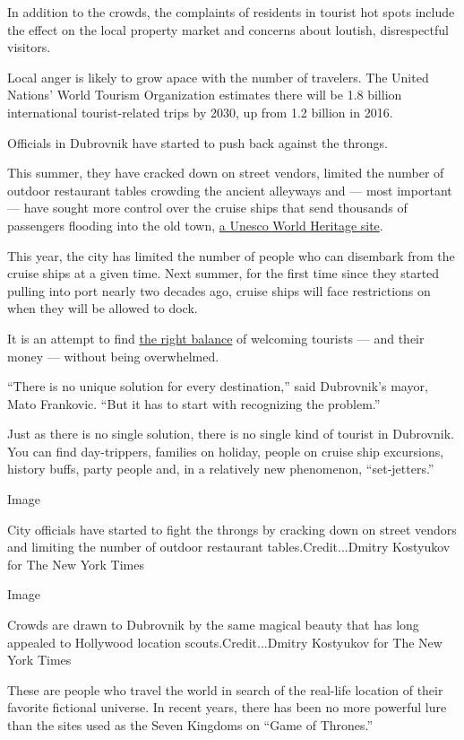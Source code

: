 In addition to the crowds, the complaints of residents in tourist hot
spots include the effect on the local property market and concerns about
loutish, disrespectful visitors.

Local anger is likely to grow apace with the number of travelers. The
United Nations' World Tourism Organization estimates there will be 1.8
billion international tourist-related trips by 2030, up from 1.2 billion
in 2016.

Officials in Dubrovnik have started to push back against the throngs.

This summer, they have cracked down on street vendors, limited the
number of outdoor restaurant tables crowding the ancient alleyways and
--- most important --- have sought more control over the cruise ships
that send thousands of passengers flooding into the old town,
\href{https://whc.unesco.org/en/list/95}{a Unesco World Heritage site}.

This year, the city has limited the number of people who can disembark
from the cruise ships at a given time. Next summer, for the first time
since they started pulling into port nearly two decades ago, cruise
ships will face restrictions on when they will be allowed to dock.

It is an attempt to find
\href{https://www.nytimes3xbfgragh.onion/2017/06/29/nyregion/how-much-tourism-is-too-much.html}{the
right balance} of welcoming tourists --- and their money --- without
being overwhelmed.

``There is no unique solution for every destination,'' said Dubrovnik's
mayor, Mato Frankovic. ``But it has to start with recognizing the
problem.''

Just as there is no single solution, there is no single kind of tourist
in Dubrovnik. You can find day-trippers, families on holiday, people on
cruise ship excursions, history buffs, party people and, in a relatively
new phenomenon, ``set-jetters.''

Image

City officials have started to fight the throngs by cracking down on
street vendors and limiting the number of outdoor restaurant
tables.Credit...Dmitry Kostyukov for The New York Times

Image

Crowds are drawn to Dubrovnik by the same magical beauty that has long
appealed to Hollywood location scouts.Credit...Dmitry Kostyukov for The
New York Times

These are people who travel the world in search of the real-life
location of their favorite fictional universe. In recent years, there
has been no more powerful lure than the sites used as the Seven Kingdoms
on ``Game of Thrones.''

